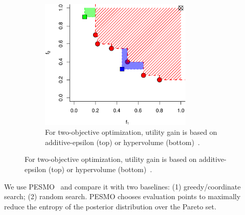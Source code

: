\begin{figure}
\begin{subfigure}{0.35\textwidth}
    \includegraphics[width=0.8\textwidth]{figures/serving-bo-2d-2.pdf}
    \caption{For two-objective optimization, utility gain is based on
      additive-epsilon (top) or hypervolume (bottom)~\cite{binoisgpareto}.}
  \end{subfigure}
\end{figure}


We use PESMO~\cite{hernandez2016predictive} and compare it with two baselines:
(1) greedy/coordinate search; (2) random search. PESMO chooses evaluation points
to maximally reduce the entropy of the posterior distribution over the Pareto
set.

